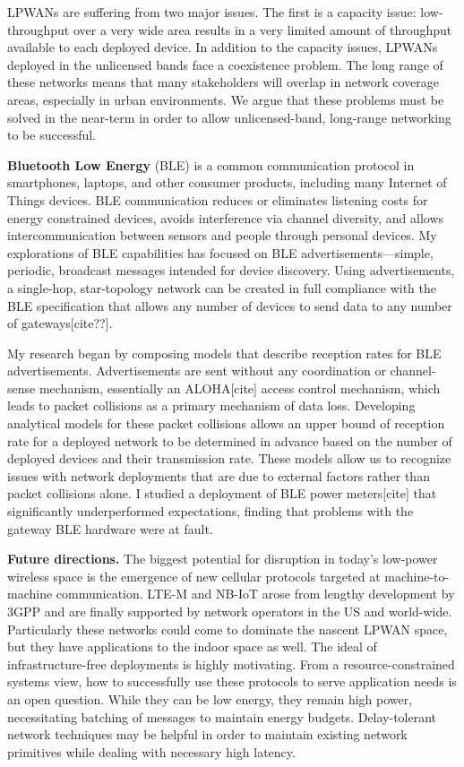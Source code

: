 \documentclass[11pt]{article} %
\begin{document}
LPWANs are suffering from two major issues. The first is a capacity issue:
low-throughput over a very wide area results in a very limited amount of
throughput available to each deployed device. In addition to the capacity
issues, LPWANs deployed in the unlicensed bands face a coexistence problem. The
long range of these networks means that many stakeholders will overlap in
network coverage areas, especially in urban environments. We argue that these
problems must be solved in the near-term in order to allow unlicensed-band,
long-range networking to be successful.

\textbf{Bluetooth Low Energy} (BLE) is a common communication protocol in smartphones,
laptops, and other consumer products, including many Internet of Things
devices. BLE communication reduces or eliminates listening costs for energy
constrained devices, avoids interference via channel diversity, and allows
intercommunication between sensors and people through personal devices. My
explorations of BLE capabilities has focused on BLE advertisements—simple,
periodic, broadcast messages intended for device discovery. Using
advertisements, a single-hop, star-topology network can be created in full
compliance with the BLE specification that allows any number of devices to send
data to any number of gateways[cite??].

My research began by composing models that describe reception rates for BLE
advertisements. Advertisements are sent without any coordination or
channel-sense mechanism, essentially an ALOHA[cite] access control mechanism,
which leads to packet collisions as a primary mechanism of data loss.
Developing analytical models for these packet collisions allows an upper bound
of reception rate for a deployed network to be determined in advance based on
the number of deployed devices and their transmission rate. These models allow
us to recognize issues with network deployments that are due to external
factors rather than packet collisions alone. I studied a deployment of BLE
power meters[cite] that significantly underperformed expectations, finding that
problems with the gateway BLE hardware were at fault.

\textbf{Future directions.} The biggest potential for disruption in today's low-power
wireless space is the emergence of new cellular protocols targeted at
machine-to-machine communication. LTE-M and NB-IoT arose from lengthy
development by 3GPP and are finally supported by network operators in the US
and world-wide. Particularly these networks could come to dominate the nascent
LPWAN space, but they have applications to the indoor space as well. The ideal
of infrastructure-free deployments is highly motivating. From a
resource-constrained systems view, how to successfully use these protocols to
serve application needs is an open question. While they can be low energy, they
remain high power, necessitating batching of messages to maintain energy
budgets. Delay-tolerant network techniques may be helpful in order to maintain
existing network primitives while dealing with necessary high latency.
\end{document}
